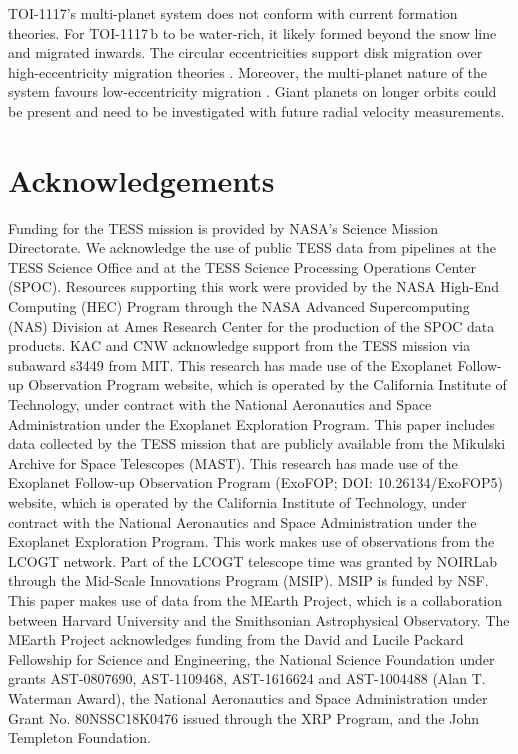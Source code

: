 \documentclass[fleqn,usenatbib,useAMS]{mnras}
\begin{document}
TOI-1117’s multi-planet system does not conform with current formation theories. For TOI-1117\,b to be water-rich, it likely formed beyond the snow line and migrated inwards. The circular eccentricities support disk migration over high-eccentricity migration theories \citep{Dawson2018}. Moreover, the multi-planet nature of the system favours low-eccentricity migration \citep{Pu2019}. Giant planets on longer orbits could be present and need to be investigated with future radial velocity measurements.

\section{Acknowledgements}

Funding for the TESS mission is provided by NASA's Science Mission Directorate. We acknowledge the use of public TESS data from pipelines at the TESS Science Office and at the TESS Science Processing Operations Center (SPOC). Resources supporting this work were provided by the NASA High-End Computing (HEC) Program through the NASA Advanced Supercomputing (NAS) Division at Ames Research Center for the production of the SPOC data products. KAC and CNW acknowledge support from the TESS mission via subaward s3449 from MIT. This research has made use of the Exoplanet Follow-up Observation Program website, which is operated by the California Institute of Technology, under contract with the National Aeronautics and Space Administration under the Exoplanet Exploration Program. This paper includes data collected by the TESS mission that are publicly available from the Mikulski Archive for Space Telescopes (MAST).
This research has made use of the Exoplanet Follow-up Observation Program (ExoFOP; DOI: 10.26134/ExoFOP5) website, which is operated by the California Institute of Technology, under contract with the National Aeronautics and Space Administration under the Exoplanet Exploration Program.
This work makes use of observations from the LCOGT network. Part of the LCOGT telescope time was granted by NOIRLab through the Mid-Scale Innovations Program (MSIP). MSIP is funded by NSF.
This paper makes use of data from the MEarth Project, which is a collaboration between Harvard University and the Smithsonian Astrophysical Observatory. The MEarth Project acknowledges funding from the David and Lucile Packard Fellowship for Science and Engineering, the National Science Foundation under grants AST-0807690, AST-1109468, AST-1616624 and AST-1004488 (Alan T. Waterman Award), the National Aeronautics and Space Administration under Grant No. 80NSSC18K0476 issued through the XRP Program, and the John Templeton Foundation.
\end{document}

